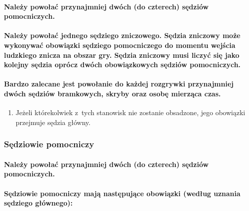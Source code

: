 \documentclass[12pt,a4paper]{article}
\begin{document}
\paragraph{Należy powołać przynajmniej dwóch (do czterech)
	sędziów pomocniczych.}

\paragraph{Należy powołać jednego sędziego zniczowego. Sędzia
	zniczowy może wykonywać obowiązki sędziego pomocniczego do momentu
	wejścia ludzkiego znicza na obszar gry. Sędzia zniczowy musi liczyć się
	jako kolejny sędzia oprócz dwóch obowiązkowych sędziów pomocniczych.}

\paragraph{Bardzo zalecane jest powołanie do każdej rozgrywki
	przynajmniej dwóch sędziów bramkowych, skryby oraz osobę mierząca czas.}

\begin{enumerate}
	\item
	      Jeżeli którekolwiek z~tych stanowisk nie zostanie obsadzone, jego
	      obowiązki przejmuje sędzia główny.
\end{enumerate}

\subsubsection{Sędziowie pomocniczy}

\paragraph{Należy powołać przynajmniej dwóch (do czterech)
	sędziów pomocniczych.}

\paragraph{Sędziowie pomocniczy mają następujące obowiązki
	(według uznania sędziego głównego):}
\end{document}
